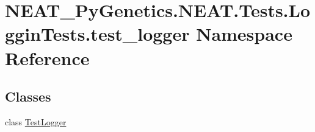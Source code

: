 \hypertarget{namespaceNEAT__PyGenetics_1_1NEAT_1_1Tests_1_1LogginTests_1_1test__logger}{}\section{N\+E\+A\+T\+\_\+\+Py\+Genetics.\+N\+E\+A\+T.\+Tests.\+Loggin\+Tests.\+test\+\_\+logger Namespace Reference}
\label{namespaceNEAT__PyGenetics_1_1NEAT_1_1Tests_1_1LogginTests_1_1test__logger}
\subsection*{Classes}
\begin{DoxyCompactItemize}
\item 
class \hyperlink{classNEAT__PyGenetics_1_1NEAT_1_1Tests_1_1LogginTests_1_1test__logger_1_1TestLogger}{Test\+Logger}
\end{DoxyCompactItemize}
